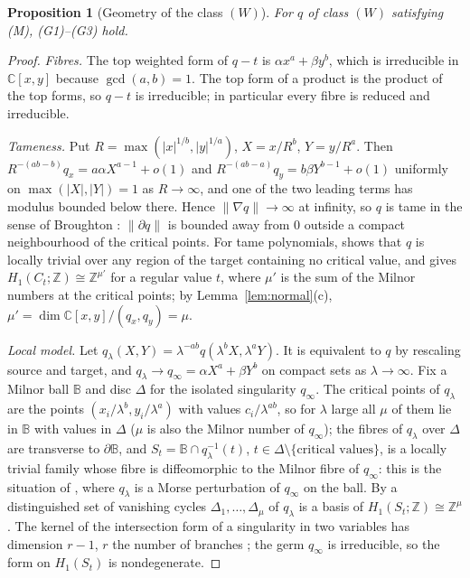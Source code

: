 \documentclass[11pt]{article}
\numberwithin{equation}{section}
\newtheorem{proposition}[theorem]{Proposition}
\theoremstyle{definition}
\theoremstyle{remark}
\newcommand{\C}{\mathbb C}\newcommand{\Q}{\mathbb Q}\newcommand{\R}{\mathbb R}\newcommand{\Z}{\mathbb Z}
\begin{document}
\begin{proposition}[Geometry of the class $(W)$]\label{prop:geometry}
For $q$ of class $(W)$ satisfying \textup{(M)}, \textup{(G1)--(G3)} hold.
\end{proposition}
\begin{proof}
\emph{Fibres.} The top weighted form of $q-t$ is $\alpha x^a+\beta y^b$, which is
irreducible in $\C[x,y]$ because $\gcd(a,b)=1$. The top form of a product is
the product of the top forms, so $q-t$ is irreducible; in particular every
fibre is reduced and irreducible.

\emph{Tameness.} Put $R=\max(|x|^{1/b},|y|^{1/a})$, $X=x/R^b$, $Y=y/R^a$. Then
$R^{-(ab-b)}q_x=a\alpha X^{a-1}+o(1)$ and $R^{-(ab-a)}q_y=b\beta Y^{b-1}+o(1)$
uniformly on $\max(|X|,|Y|)=1$ as $R\to\infty$, and one of the two leading terms
has modulus bounded below there. Hence $\|\nabla q\|\to\infty$ at infinity, so
$q$ is tame in the sense of Broughton \cite[Definition~3.1]{Br}: $\|\partial q\|$
is bounded away from $0$ outside a compact neighbourhood of the critical
points. For tame polynomials, \cite[p.~230]{Br} shows that $q$ is locally
trivial over any region of the target containing no critical value, and
\cite[Theorem~1.2 and p.~231]{Br} gives $H_1(C_t;\Z)\cong\Z^{\mu'}$ for a regular
value $t$, where $\mu'$ is the sum of the Milnor numbers at the critical points;
by Lemma~\ref{lem:normal}(c), $\mu'=\dim\C[x,y]/(q_x,q_y)=\mu$.

\emph{Local model.} Let $q_\lambda(X,Y)=\lambda^{-ab}q(\lambda^bX,\lambda^aY)$. It
is equivalent to $q$ by rescaling source and target, and
$q_\lambda\to q_\infty=\alpha X^a+\beta Y^b$ on compact sets as
$\lambda\to\infty$. Fix a Milnor ball $\mathbb B$ and disc $\Delta$ for the
isolated singularity $q_\infty$. The critical points of $q_\lambda$ are the points
$(x_i/\lambda^b,y_i/\lambda^a)$ with values $c_i/\lambda^{ab}$, so for $\lambda$
large all $\mu$ of them lie in $\mathbb B$ with values in $\Delta$ ($\mu$ is also
the Milnor number of $q_\infty$); the fibres of
$q_\lambda$ over $\Delta$ are transverse to $\partial\mathbb B$, and
$S_t=\mathbb B\cap q_\lambda^{-1}(t)$, $t\in\Delta\setminus\{\text{critical
values}\}$, is a locally trivial family whose fibre is diffeomorphic to the
Milnor fibre of $q_\infty$: this is the situation of \cite[\S2.1]{AGV}, where
$q_\lambda$ is a Morse perturbation of $q_\infty$ on the ball. By
\cite[Theorem~2.1]{AGV} a distinguished set of vanishing cycles
$\Delta_1,\dots,\Delta_\mu$ of $q_\lambda$ is a basis of $H_1(S_t;\Z)\cong\Z^\mu$.
The kernel of the intersection form of a singularity in two variables has
dimension $r-1$, $r$ the number of branches \cite[\S3.6, p.~100]{AGV}; the germ
$q_\infty$ is irreducible, so the form on $H_1(S_t)$ is nondegenerate.


\end{proof}
\end{document}
